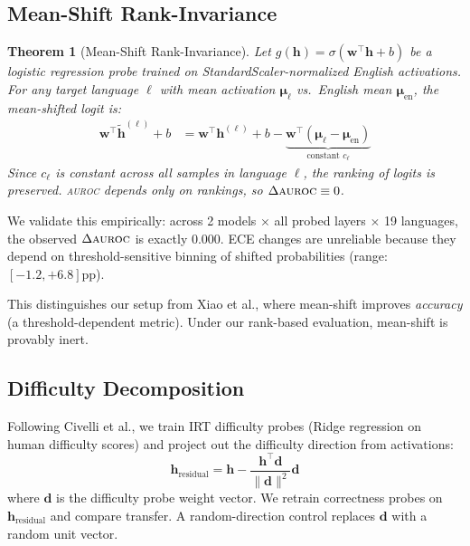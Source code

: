 \documentclass[11pt,a4paper]{article}
\newtheorem{theorem}{Theorem}
\newcommand{\auroc}{\textsc{auroc}}
\begin{document}
\subsection{Mean-Shift Rank-Invariance}
\label{sec:mean_shift}

\begin{theorem}[Mean-Shift Rank-Invariance]
Let $g(\mathbf{h}) = \sigma(\mathbf{w}^\top \mathbf{h} + b)$ be a logistic regression probe trained on StandardScaler-normalized English activations. For any target language $\ell$ with mean activation $\boldsymbol{\mu}_\ell$ vs.\ English mean $\boldsymbol{\mu}_{\text{en}}$, the mean-shifted logit is:
\begin{align}
\mathbf{w}^\top \tilde{\mathbf{h}}^{(\ell)} + b &= \mathbf{w}^\top \mathbf{h}^{(\ell)} + b - \underbrace{\mathbf{w}^\top(\boldsymbol{\mu}_\ell - \boldsymbol{\mu}_{\text{en}})}_{\text{constant } c_\ell}
\end{align}
Since $c_\ell$ is constant across all samples in language $\ell$, the ranking of logits is preserved. \auroc{} depends only on rankings, so $\Delta\auroc{} \equiv 0$.
\end{theorem}

We validate this empirically: across 2 models $\times$ all probed layers $\times$ 19 languages, the observed $\Delta\auroc{}$ is exactly 0.000. ECE changes are unreliable because they depend on threshold-sensitive binning of shifted probabilities (range: $[-1.2, +6.8]$pp).

This distinguishes our setup from Xiao et al., where mean-shift improves \emph{accuracy} (a threshold-dependent metric). Under our rank-based evaluation, mean-shift is provably inert.

\subsection{Difficulty Decomposition}

Following Civelli et al., we train IRT difficulty probes (Ridge regression on human difficulty scores) and project out the difficulty direction from activations:
\begin{equation}
\mathbf{h}_{\text{residual}} = \mathbf{h} - \frac{\mathbf{h}^\top \mathbf{d}}{\|\mathbf{d}\|^2} \mathbf{d}
\end{equation}
where $\mathbf{d}$ is the difficulty probe weight vector. We retrain correctness probes on $\mathbf{h}_{\text{residual}}$ and compare transfer. A random-direction control replaces $\mathbf{d}$ with a random unit vector.
\end{document}
